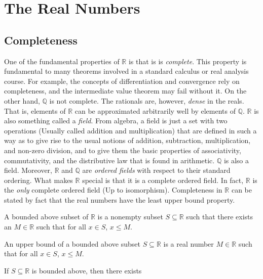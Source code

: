 \section{The Real Numbers}
    \subsection{Completeness}
        One of the fundamental properties of $\mathbb{R}$ is that is is
        \textit{complete}. This property is fundamental to many theorems
        involved in a standard calculus or real analysis course. For
        example, the concepts of differentiation and convergence rely on
        completeness, and the intermediate value theorem may fail without it.
        On the other hand, $\mathbb{Q}$ is not complete. The rationals are,
        however, \textit{dense} in the reals. That is, elements of $\mathbb{R}$
        can be approximated arbitrarily well by elements of $\mathbb{Q}$.
        $\mathbb{R}$ is also something called a \textit{field}. From algebra,
        a field is just a set with two operations (Usually called addition and
        multiplication) that are defined in such a way as to give rise
        to the usual notions of addition, subtraction, multiplication, and
        non-zero division, and to give them the basic properties of
        associativity, commutativity, and the distributive law that is found in
        arithmetic. $\mathbb{Q}$ is also a field. Moreover, $\mathbb{R}$ and
        $\mathbb{Q}$ are \textit{ordered fields} with respect to their standard
        ordering. What makes $\mathbb{R}$ special is that it is a complete
        ordered field. In fact, $\mathbb{R}$ is the \textit{only} complete
        ordered field (Up to isomorphism). Completeness in $\mathbb{R}$ can be
        stated by fact that the real numbers have the least upper bound
        property.
        \begin{definition}
            A bounded above subset of $\mathbb{R}$ is a nonempty subset
            $S\subseteq{\mathbb{R}}$ such that there exists an $M\in\mathbb{R}$
            such that for all $x\in{S}$, $x\leq{M}$.
        \end{definition}
        \begin{definition}
            An upper bound of a bounded above subset $S\subseteq\mathbb{R}$ is
            a real number $M\in\mathbb{R}$ such that for all $x\in{S}$,
            $x\leq{M}$.
        \end{definition}
        If $S\subseteq\mathbb{R}$ is bounded above, then there exists
